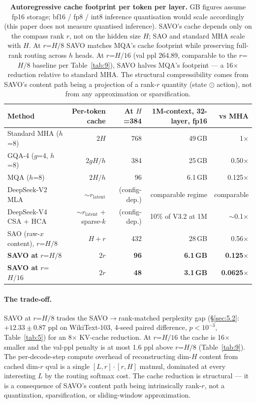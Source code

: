 \begin{table}[H]
\centering
\small
\renewcommand{\arraystretch}{1.2}
\begin{tabular*}{\linewidth}{@{\extracolsep{\fill}}lrrrr@{}}
\toprule
Method & Per-token cache & At $H$=384 & 1M-context, 32-layer, fp16 & vs MHA \\
\midrule
Standard MHA ($h$=8) & $2H$ & 768 & 49\,GB & 1$\times$ \\
GQA-4 ($g$=4, $h$=8) & $2gH/h$ & 384 & 25\,GB & 0.50$\times$ \\
MQA ($h$=8) & $2H/h$ & 96 & 6.1\,GB & 0.125$\times$ \\
DeepSeek-V2 MLA \cite{ref23} & $\sim r_{\mathrm{latent}}$ & (config-dep.) & comparable regime & comparable \\
DeepSeek-V4 CSA + HCA \cite{ref18} & $\sim r_{\mathrm{latent}}$ + sparse-$k$ & (config-dep.) & 10\% of V3.2 at 1M & $\sim$0.1$\times$ \\
SAO (raw-$x$ content), $r$=$H/8$ & $H + r$ & 432 & 28\,GB & 0.56$\times$ \\
\textbf{SAVO at} $r$=$H/8$ & $2r$ & \textbf{96} & \textbf{6.1\,GB} & \textbf{0.125}$\boldsymbol{\times}$ \\
\textbf{SAVO at} $r$=$H/16$ & $2r$ & \textbf{48} & \textbf{3.1\,GB} & \textbf{0.0625}$\boldsymbol{\times}$ \\
\bottomrule
\end{tabular*}
\caption{\textbf{Autoregressive cache footprint per token per layer.} GB figures assume fp16 storage; bf16 / fp8 /
int8 inference quantisation would scale accordingly (this paper does not measure quantised inference). SAVO's
cache depends only on the compass rank $r$, not on the hidden size $H$; SAO and standard MHA scale with $H$. At
$r$=$H/8$ SAVO matches MQA's cache footprint while preserving full-rank routing across $h$ heads. At $r$=$H/16$ (val
ppl 264.89, comparable to the $r$=$H/8$ baseline per Table~\ref{tab:9}), SAVO halves MQA's footprint --- a 16$\times$ reduction
relative to standard MHA. The structural compressibility comes from SAVO's content path being a projection of a
rank-$r$ quantity (state $\odot$ action), not from any approximation or sparsification.}
\label{tab:11}
\end{table}

\paragraph{The trade-off.} SAVO at $r$=$H/8$ trades the SAVO$\rightarrow$rank-matched perplexity gap (\S\ref{sec:5.2}: $+12.33 \pm 0.87$
ppl on WikiText-103, 4-seed paired difference, $p < 10^{-3}$, Table~\ref{tab:5}) for an 8$\times$ KV-cache reduction. At
$r$=$H/16$ the cache is 16$\times$ smaller and the val-ppl penalty is at most 1.6 ppl above $r$=$H/8$ (Table~\ref{tab:9}). The
per-decode-step compute overhead of reconstructing dim-$H$ content from cached dim-$r$ qval is a single
$[L, r] \cdot [r, H]$ matmul, dominated at every interesting $L$ by the routing softmax cost. The cache reduction
is structural --- it is a consequence of SAVO's content path being intrinsically rank-$r$, not a quantization,
sparsification, or sliding-window approximation.

